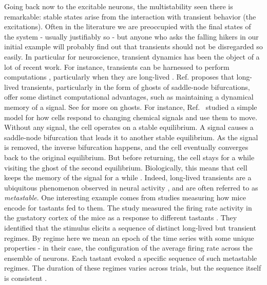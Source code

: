 Going back now to the excitable neurons, the multistability seen there is remarkable: stable states arise from the interaction with transient behavior (the excitations). Often in the literature we are preoccupied with the final states of the system - usually justifiably so - but anyone who asks the falling hikers in our initial example will probably find out that transients should not be disregarded so easily. In particular for neuroscience, transient dynamics has been the object of a lot of recent work. For instance, transients can be harnessed to perform computations \cite{budzinski2023an}, particularly when they are long-lived \cite{koch2024biological}. Ref. \cite{koch2024biological} proposes that long-lived transients, particularly in the form of ghosts of saddle-node bifurcations, offer some distinct computational advantages, such as maintaining a dynamical memory of a signal. See  for more on ghosts. For instance, Ref.~\cite{nandan2022cells} studied a simple model for how cells respond to changing chemical signals and use them to move. Without any signal, the cell operates on a stable equilibrium. A signal causes a saddle-node bifurcation that leads it to another stable equilibrium. As the signal is removed, the inverse bifurcation happens, and the cell eventually converges back to the original equilibrium. But before returning, the cell stays for a while visiting the ghost of the second equilibrium. Biologically, this means that cell keeps the memory of the signal for a while \cite{nandan2022cells, koch2024biological}. 
Indeed, long-lived transients are a ubiquitous phenomenon observed in neural activity \cite{tognoli2014metastable, brinkman2022metastable}, and are often referred to as \textit{metastable}. One interesting example comes from studies measuring how mice encode for tastants fed to them. The study measured the firing rate activity in the gustatory cortex of the mice as a response to different tastants \cite{jones2007natural}. They identified that the stimulus elicits a sequence of distinct long-lived but transient regimes. By regime here we mean an epoch of the time series with some unique properties - in their case, the configuration of the average firing rate across the ensemble of neurons. Each tastant evoked a specific sequence of such metastable regimes. The duration of these regimes varies across trials, but the sequence itself is consistent \cite{lacamera2019cortical, brinkman2022metastable}.

